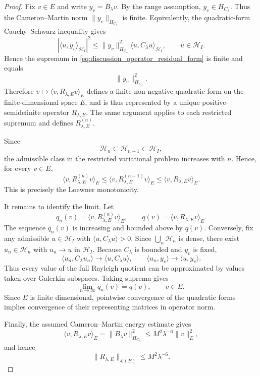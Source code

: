 \begin{proof}
Fix $v\in E$ and write $y_v=B_\lambda v$.  By the range assumption,
$y_v\in H_{C_\lambda}$.  Thus the Cameron--Martin norm
$\|y_v\|_{H_{C_\lambda}}$ is finite.  Equivalently, the quadratic-form
Cauchy--Schwarz inequality gives
\[
  |\langle u,y_v\rangle_{\mathcal H_I}|^2
  \le
  \|y_v\|_{H_{C_\lambda}}^2
  \langle u,C_\lambda u\rangle_{\mathcal H_I},
  \qquad u\in\mathcal H_I .
\]
Hence the supremum in
\eqref{eq:discussion_operator_residual_form} is finite and equals
\[
  \|y_v\|_{H_{C_\lambda}}^2 .
\]
Therefore $v\mapsto \langle v,R_{\lambda,E}v\rangle_E$ defines a finite
non-negative quadratic form on the finite-dimensional space $E$, and is thus
represented by a unique positive-semidefinite operator $R_{\lambda,E}$.
The same argument applies to each restricted supremum and defines
$R_{\lambda,E}^{(n)}$.

Since
\[
  \mathcal H_n\subset \mathcal H_{n+1}\subset\mathcal H_I,
\]
the admissible class in the restricted variational problem increases
with $n$.  Hence, for every $v\in E$,
\[
  \langle v,R_{\lambda,E}^{(n)}v\rangle_E
  \le
  \langle v,R_{\lambda,E}^{(n+1)}v\rangle_E
  \le
  \langle v,R_{\lambda,E}v\rangle_E .
\]
This is precisely the Loewner monotonicity.

It remains to identify the limit.  Let
\[
  q_n(v)=\langle v,R_{\lambda,E}^{(n)}v\rangle_E,
  \qquad
  q(v)=\langle v,R_{\lambda,E}v\rangle_E .
\]
The sequence $q_n(v)$ is increasing and bounded above by $q(v)$.
Conversely, fix any admissible $u\in\mathcal H_I$ with
$\langle u,C_\lambda u\rangle>0$.  Since $\bigcup_n\mathcal H_n$ is
dense, there exist $u_n\in\mathcal H_n$ with $u_n\to u$ in
$\mathcal H_I$.  Because $C_\lambda$ is bounded and $y_v$ is fixed,
\[
  \langle u_n,C_\lambda u_n\rangle
  \to
  \langle u,C_\lambda u\rangle,
  \qquad
  \langle u_n,y_v\rangle
  \to
  \langle u,y_v\rangle .
\]
Thus every value of the full Rayleigh quotient can be approximated by
values taken over Galerkin subspaces.  Taking suprema gives
\[
  \lim_{n\to\infty}q_n(v)=q(v),
  \qquad v\in E .
\]
Since $E$ is finite dimensional, pointwise convergence of the quadratic
forms implies convergence of their representing matrices in operator
norm.

Finally, the assumed Cameron--Martin energy estimate gives
\[
  \langle v,R_{\lambda,E}v\rangle_E
  =
  \|B_\lambda v\|_{H_{C_\lambda}}^2
  \le
  M^2\lambda^{-6}\|v\|_E^2,
\]
and hence
\[
  \|R_{\lambda,E}\|_{\mathcal L(E)}
  \le M^2\lambda^{-6}.
\]
\end{proof}

